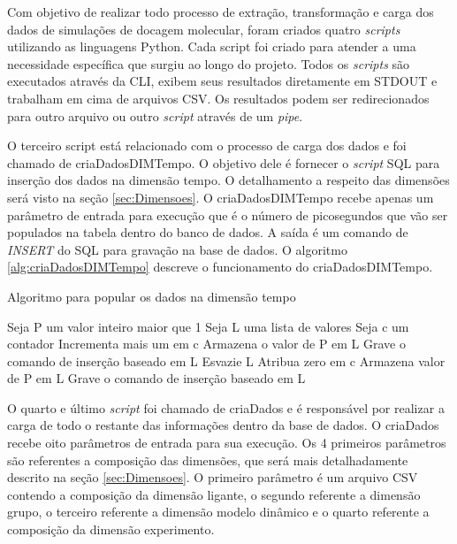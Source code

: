 \begin{itemize}
Com objetivo de realizar todo processo de extração, transformação e carga dos dados de simulações de docagem molecular, foram criados quatro \emph{scripts} utilizando as linguagens Python. Cada script foi criado para atender a uma necessidade específica que surgiu ao longo do projeto. Todos os \emph{scripts} são executados através da CLI, exibem seus resultados diretamente em STDOUT e trabalham em cima de arquivos CSV. Os resultados podem ser redirecionados para outro arquivo ou outro \emph{script} através de um \emph{pipe}.



O terceiro script está relacionado com o processo de carga dos dados e foi chamado de criaDadosDIMTempo. O objetivo dele é fornecer o \emph{script} SQL para inserção dos dados na dimensão tempo. O detalhamento a respeito das dimensões será visto na seção \ref{sec:Dimensoes}. O criaDadosDIMTempo recebe apenas um parâmetro de entrada para execução que é o número de picosegundos que vão ser populados na tabela dentro do banco de dados. A saída é um comando de \emph{INSERT} do SQL para gravação na base de dados. O algoritmo \ref{alg:criaDadosDIMTempo} descreve o funcionamento do criaDadosDIMTempo.

\begin{algorithm}[H]
\caption{Algoritmo para popular os dados na dimensão tempo}
\label{alg:criaDadosDIMTempo}
{\fontsize{10}{10}\selectfont
\begin{algorithmic}[1]
	\STATE Seja P um valor inteiro maior que 1
	\STATE Seja L uma lista de valores
	\STATE Seja c um contador
		\STATE Incrementa mais um em c
			\STATE Armazena o valor de P em L
			\STATE Grave o comando de inserção baseado em L
			\STATE Esvazie L
			\STATE Atribua zero em c
		\ELSE
			\STATE Armazena valor de P em L
		\ENDIF
	\ENDFOR
		\STATE Grave o comando de inserção baseado em L
	\ENDIF
\end{algorithmic}
}
\end{algorithm}






O quarto e último \emph{script} foi chamado de criaDados e é responsável por realizar a carga de todo o restante das informações dentro da base de dados. O criaDados recebe oito parâmetros de entrada para sua execução. Os 4 primeiros parâmetros são referentes a composição das dimensões, que será mais detalhadamente descrito na seção \ref{sec:Dimensoes}. O primeiro parâmetro é um arquivo CSV contendo a composição da dimensão ligante, o segundo referente a dimensão grupo, o terceiro referente a dimensão modelo dinâmico e o quarto referente a composição da dimensão experimento. 


\end{itemize}
